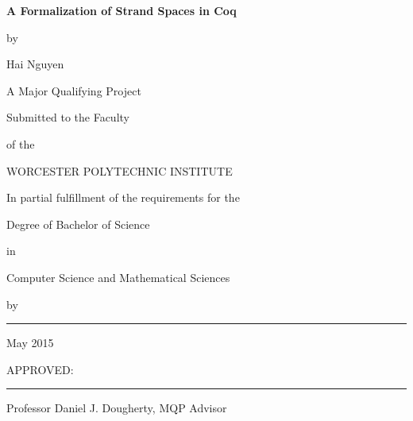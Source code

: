 \documentclass[12pt]{report}
\begin{document}
\newcommand{\brk}{\vspace*{0.18in}}

\thispagestyle{empty}

\begin{center}

\brk
   {\large 
	\textbf{
	 	A Formalization of Strand Spaces in Coq
	}
   }


\brk
by

\brk
Hai Nguyen


\brk\brk
A Major Qualifying Project

\brk
Submitted to the Faculty

\brk
of the 

\brk
WORCESTER POLYTECHNIC INSTITUTE
	
\brk
In partial fulfillment of the requirements for the

\brk
Degree of Bachelor of Science

\brk
in

\brk
Computer Science and Mathematical Sciences

\brk
by

\brk\brk
\rule{3in}{1.2pt}

\brk
May 2015

\end{center}

	
\vfill
APPROVED:

\vspace{0.5in}
\rule{3in}{0.8pt}

Professor Daniel J. Dougherty, MQP Advisor

\newpage

\doublespacing
\end{document}
